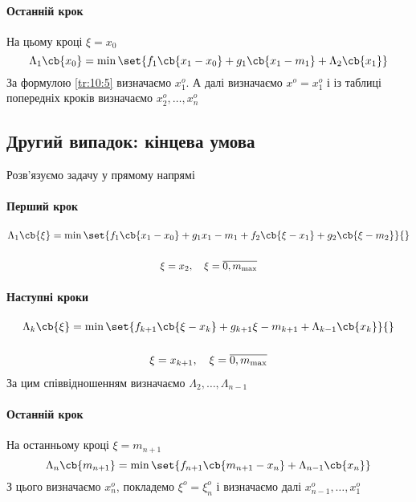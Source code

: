 \paragraph{Останній крок}
На цьому кроці $\xi=x_0$
\begin{equation}\label{tr:10:5}
	\Lambda_1\cb{x_0} = \min \set{f_1\cb{x_1-x_0} + g_1 \cb{x_1-m_1} + \Lambda_2\cb{x_1}}
\end{equation}
За формулою \eqref{tr:10:5} визначаємо $x_1^o$. А далі визначаємо $x^o=x_1^o$ і із таблиці попередніх кроків визначаємо $x_2^o,\ldots,x_n^o$
\subsection{Другий випадок: кінцева умова}
Розв’язуємо задачу у прямому напрямі
\paragraph{Перший крок}
\begin{multline}
	\Lambda_1\cb{\xi} = \min\set{ f_1\cb{x_1-x_0} + g_1{x_1-m_1} + f_2\cb{\xi-x_1} + g_2 \cb{\xi-m_2} }{}\\{}\\ \xi=x_2,\quad\xi=\overline{0,m_{\max}}
\end{multline}
\paragraph{Наступні кроки}
\begin{multline}
	\Lambda_k\cb{\xi} = \min\set{ f_{k+1}\cb{\xi-x_k} + g_{k+1}{\xi-m_{k+1}} + \Lambda_{k-1}\cb{x_k}}{}\\{}\\ \xi=x_{k+1},\quad\xi=\overline{0,m_{\max}}
\end{multline}
За цим співвідношенням визначаємо $\Lambda_2,\ldots,\Lambda_{n-1}$
\paragraph{Останній крок}
На останньому кроці $\xi = m_{n+1}$
\begin{equation}
	\Lambda_n\cb{m_{n+1}} = \min\set{ f_{n+1} \cb{m_{n+1} - x_n} + \Lambda_{n-1}\cb{x_n} }
\end{equation}
З цього визначаємо $x_n^o$, покладемо $\xi^o=\xi_n^o$ і визначаємо далі $x_{n-1}^o,\ldots,x_1^o$
